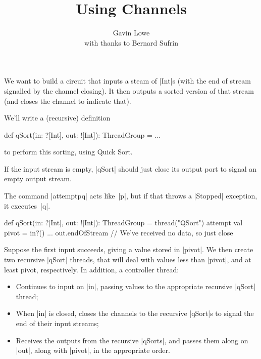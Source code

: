 \documentclass[notes,color]{sepslide0}
\title{Using Channels}
\author{Gavin Lowe \\ with thanks to Bernard Sufrin}
\begin{document}
\begin{slide}
  
  \Title

\end{slide}



\begin{slide}

We want to build a circuit that inputs a steam of |Int|s (with the end of
stream signalled by the channel closing).  It then outputs a
sorted version of that stream (and closes the channel to indicate that).

We'll write a (recursive) definition
%
\begin{scala}
  def qSort(in: ?[Int], out: ![Int]): ThreadGroup = ...
\end{scala}
%
to perform this sorting, using Quick Sort.
\end{slide}


\begin{slide}

If the input stream is empty, |qSort| should just close its output port to
signal an empty output stream.

The command |attempt{p}{q}| acts like~|p|, but if that throws a |Stopped|
exception, it executes~|q|.

\begin{scala}
  def qSort(in: ?[Int], out: ![Int]): ThreadGroup = thread("QSort"){
    attempt{
      val pivot = in?()
      ...
    }{
      out.endOfStream // We've received no data, so just close
    }
  }
\end{scala}
\end{slide}


\begin{slide}

Suppose the first input succeeds, giving a value stored in |pivot|.  We then
create two recursive |qSort| threads, that will deal with values less than
|pivot|, and at least pivot, respectively.  In addition, a controller thread:
%
\begin{itemize}
\item Continues to input on |in|, passing values to the appropriate recursive
  |qSort| thread;

\item When |in| is closed, closes the channels to the recursive |qSort|s to
  signal the end of their input streams;

\item Receives the outputs from the recursive |qSorts|, and passes them along
  on |out|, along with |pivot|, in the appropriate order.
\end{itemize}
\end{slide}
\end{document}
